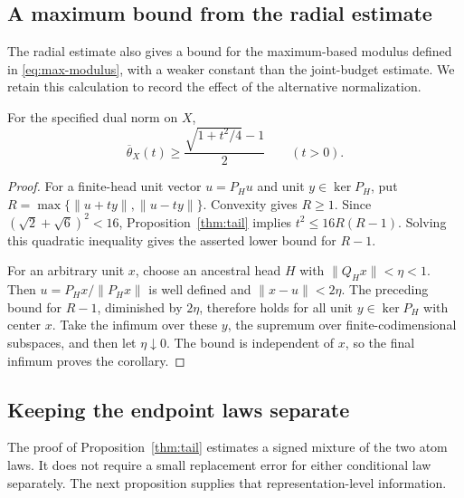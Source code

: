 \subsection{A maximum bound from the radial estimate}

The radial estimate also gives a bound for the maximum-based modulus
defined in \eqref{eq:max-modulus}, with a weaker constant than the
joint-budget estimate. We retain this calculation to record the effect
of the alternative normalization.

\begin{corollary}\label{cor:max-modulus}
For the specified dual norm on $X$,
\[
 \overline\theta_X(t)\ge\frac{\sqrt{1+t^2/4}-1}{2}\qquad(t>0).
\]
\end{corollary}

\begin{proof}
For a finite-head unit vector $u=P_Hu$ and unit $y\in\ker P_H$, put
$R=\max\{\|u+ty\|,\|u-ty\|\}$. Convexity gives $R\ge1$.
Since $(\sqrt2+\sqrt6)^2<16$, Proposition~\ref{thm:tail} implies
$t^2\le16R(R-1)$. Solving this quadratic inequality gives the asserted
lower bound for $R-1$.

For an arbitrary unit $x$, choose an ancestral head $H$ with
$\|Q_Hx\|<\eta<1$. Then $u=P_Hx/\|P_Hx\|$ is well defined
and $\|x-u\|<2\eta$. The preceding bound for $R-1$, diminished
by $2\eta$, therefore holds for all unit $y\in\ker P_H$ with center
$x$. Take the infimum over these $y$, the supremum over finite-codimensional
subspaces, and then let $\eta\downarrow0$. The bound is independent
of $x$, so the final infimum proves the corollary.
\end{proof}

\subsection{Keeping the endpoint laws separate}

The proof of Proposition~\ref{thm:tail} estimates a signed mixture of the
two atom laws. It does not require a small replacement error for either
conditional law separately. The next proposition supplies that
representation-level information.

